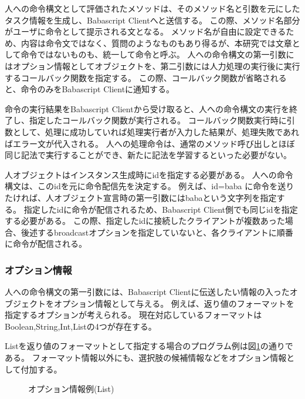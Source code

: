 \documentclass[twoside]{wiss}
\begin{document}
人への命令構文として評価されたメソッドは、そのメソッド名と引数を元にしたタスク情報を生成し、Babascript Clientへと送信する。
この際、メソッド名部分がユーザに命令として提示される文となる。
メソッド名が自由に設定できるため、内容は命令文ではなく、質問のようなものもあり得るが、本研究では文章として命令ではないものも、統一して命令と呼ぶ。
人への命令構文の第一引数にはオプション情報としてオブジェクトを、第二引数には人力処理の実行後に実行するコールバック関数を指定する。
この際、コールバック関数が省略されると、命令のみをBabascript Clientに通知する。

命令の実行結果をBabascript Clientから受け取ると、人への命令構文の実行を終了し、指定したコールバック関数が実行される。
コールバック関数実行時に引数として、処理に成功していれば処理実行者が入力した結果が、処理失敗であればエラー文が代入される。
人への処理命令は、通常のメソッド呼び出しとほぼ同じ記法で実行することができ、新たに記法を学習するといった必要がない。

人オブジェクトはインスタンス生成時にidを指定する必要がある。
人への命令構文は、このidを元に命令配信先を決定する。
例えば、id=baba に命令を送りたければ、人オブジェクト宣言時の第一引数にはbabaという文字列を指定する。
指定したidに命令が配信されるため、Babascript Client側でも同じidを指定する必要がある。
この際、指定したidに接続したクライアントが複数あった場合、後述するbroadcastオプションを指定していないと、各クライアントに順番に命令が配信される。
  
\subsubsection{オプション情報}
人への命令構文の第一引数には、Babascript Clientに伝送したい情報の入ったオブジェクトをオプション情報として与える。
例えば、返り値のフォーマットを指定するオプションが考えられる。
現在対応しているフォーマットはBoolean,String,Int,Listの4つが存在する。

Listを返り値のフォーマットとして指定する場合のプログラム例は図\ref{script_02}の通りである。
フォーマット情報以外にも、選択肢の候補情報などをオプション情報として付加する。

\begin{figure}[!h]  
  \centering
  \caption{オプション情報例(List)}
  \label{script_02}
\end{figure}
\end{document}
